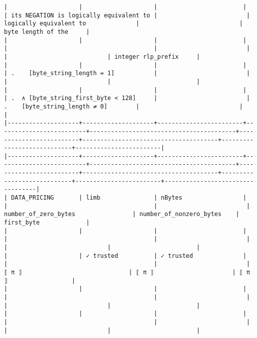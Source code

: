\documentclass[varwidth=\maxdimen,margin=0.5cm,multi={verbatim}]{standalone}
\begin{document}
\begin{verbatim}
|                    |                    |                        |                         | its NEGATION is logically equivalent to |                         | logically equivalent to              |                            | byte length of the     |
|                    |                    |                        |                         |                                         |                         |                                      |                            | integer rlp_prefix     |
|                    |                    |                        |                         | .    [byte_string_length = 1]           |                         |                                      |                            |                        |
|                    |                    |                        |                         | .  ∧ [byte_string_first_byte < 128]     |                         | .    [byte_string_length ≠ 0]        |                            |                        |
|--------------------+--------------------+------------------------+-------------------------+-----------------------------------------+-------------------------+--------------------------------------+----------------------------+------------------------|
|--------------------+--------------------+------------------------+-------------------------+-----------------------------------------+-------------------------+--------------------------------------+----------------------------+------------------------+----------------------------------|
| DATA_PRICING       | limb               | nBytes                 |                         |                                         |                         |  number_of_zero_bytes                | number_of_nonzero_bytes    | first_byte             |
|                    |                    |                        |                         |                                         |                         |                                      |                            |                        |
|                    | ✓ trusted          | ✓ trusted              |                         |                                         |                         |   ⟦ π ⟧                              | ⟦ π ⟧                      | ⟦ π ⟧                  |
|                    |                    |                        |                         |                                         |                         |                                      |                            |                        |
|                    |                    |                        |                         |                                         |                         |                                      |                            |                        |

\end{verbatim}
\end{document}
